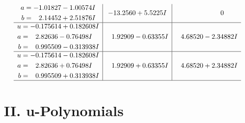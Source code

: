 \documentclass[1p]{elsarticle_modified}
\theoremstyle{definition}
\begin{document}
$$\begin{array}{c|c|c}
\begin{aligned}
a &= -1.01827 - 1.00574 I \\
b &= \phantom{-}2.14452 + 2.51876 I\end{aligned}
 & -13.2560 + 5.5225 I & \phantom{-0.000000 } 0 \\ \hline\begin{aligned}
u &= -0.175614 + 0.182608 I \\
a &= \phantom{-}2.82636 - 0.76498 I \\
b &= \phantom{-}0.995509 - 0.313938 I\end{aligned}
 & \phantom{-}1.92909 - 0.63355 I & \phantom{-}4.68520 - 2.34882 I \\ \hline\begin{aligned}
u &= -0.175614 - 0.182608 I \\
a &= \phantom{-}2.82636 + 0.76498 I \\
b &= \phantom{-}0.995509 + 0.313938 I\end{aligned}
 & \phantom{-}1.92909 + 0.63355 I & \phantom{-}4.68520 + 2.34882 I\\
 \hline 
 \end{array}$$\newpage
\newpage\renewcommand{\arraystretch}{1}
\centering \section*{ II. u-Polynomials}
\end{document}

